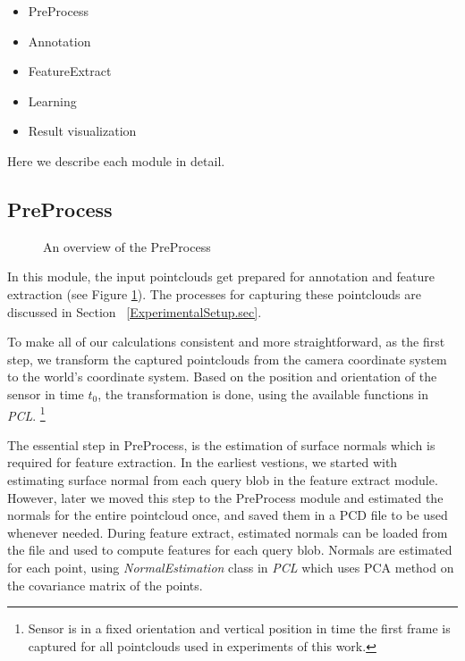 \begin{itemize}
  \item PreProcess
  \item Annotation
  \item FeatureExtract
  \item Learning
  \item Result visualization
\end{itemize}
Here we describe each module in detail.

\subsection{PreProcess}
\label{PreProcess.ssec}

\begin{figure}[t]
  \caption[PreProcess Overview Flowchart]
  {An overview of the PreProcess}
  \label{PreProcessFlowchart.figure}
\end{figure}

 In this module, the input pointclouds get prepared for annotation and feature extraction (see Figure \ref{PreProcessFlowchart.figure}).
 The processes for capturing these pointclouds are discussed in Section ~\ref{ExperimentalSetup.sec}. 
 
 
 To make all of our calculations consistent and more straightforward, as the first step, we transform the captured pointclouds from the camera coordinate system to the world's coordinate system. Based on the position and orientation of the sensor in time $t_0$, the transformation is done, using the available functions in {\it PCL}.  
 \footnote{Sensor is in a fixed orientation and vertical position in time the first frame is captured for all pointclouds 
 used in experiments of this work.}
 
 
 The essential step in PreProcess, is the estimation of surface normals which is required for feature extraction. %
 In the earliest vestions, we started with estimating surface normal from each query blob in the feature extract module. However, later we moved this step to the PreProcess module and estimated the normals for the entire pointcloud once, and saved them in a PCD file to be used whenever needed. During feature extract, estimated normals can be loaded from the file and used to compute features for each query blob. Normals are estimated for each point, using {\it NormalEstimation} class in {\it PCL} which uses PCA method on the covariance matrix of the points.
 
